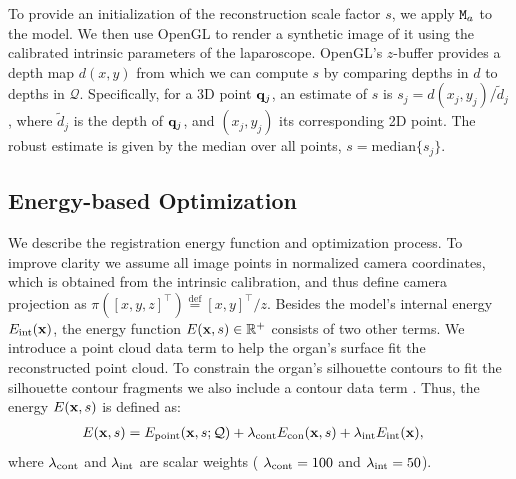 To provide an initialization of the reconstruction scale factor $s$, we apply $\mat{M}_a$ to the model.
We then use OpenGL to render a synthetic image of it using the calibrated intrinsic parameters of the laparoscope. 
OpenGL's $z$-buffer provides a depth map $d(x,y)$ from which we can compute $s$ by comparing depths in $d$ to depths in $\mathcal{Q}$.
Specifically, for a 3D point $\mathbf{q}_j$, an estimate of $s$ is  $s_j=d(x_j,y_j)/\tilde{d}_j$, where $\tilde{d}_j$ is the depth of $\mathbf{q}_j$, and $(x_j,y_j)$ its corresponding 2D point.
The robust estimate is given by the median over all points, $s=\mathrm{median} \{s_j\}$. 


\subsection{Energy-based Optimization}
\label{sec:enOpt}
We describe the registration energy function and optimization process. To improve clarity we assume all image points in normalized camera coordinates, which is obtained from the intrinsic calibration, and thus define camera projection as
$\pi(\left[x,y,z\right]^{\top})\overset{\mathrm{def}}{=}\left[x,y\right]^{\top}/z$. 
Besides the model's internal energy $E_{\text{int}}(\mathbf{x})$, the energy function $E(\mathbf{x},s)\in\mathbb{R}^+$ consists of two other terms.
We introduce a point cloud data term \Epoint to help the organ's surface fit the reconstructed point cloud.
To constrain the organ's silhouette contours to fit the silhouette contour fragments we also include a contour data term \Econtour. 
Thus, the energy $E(\mathbf{x},s)$ is defined as:
\begin{equation}
\label{eq:totalCost}
\begin{split}
E(\vet{x},s)=\Epoint(\vet{x},s;\mathcal{Q}) & + \lambdaContour\Econtour(\vet{x},s)
+\lambdaInternal\Einternal(\vet{x}),
\end{split}
\end{equation}
\noindent where $\lambda_{\text{cont}}$ and $\lambda_{\text{int}}$ are scalar weights ( $\lambda_{\text{cont}}=100$ and $\lambda_{\text{int}}=50$).

